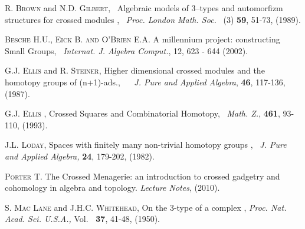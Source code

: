 \documentclass[a4paper,11pt]{article}
\theoremstyle{plain}
\theoremstyle{definition}
\begin{document}
\begin{thebibliography}{99}
	
	 \textsc{R. Brown} and \textsc{N.D. Gilbert}, \textrm{\
		Algebraic models of 3--types and automorfizm structures for crossed modules}
	, \ \emph{Proc. London Math. Soc.} \ (3) \textbf{59}, 51-73, (1989).
	
	 \textsc{Besche H.U., Eick B. and O'Brien E.A.} A
	millennium project: constructing Small Groups, \emph{\ Internat. J. Algebra
		Comput.}, 12, 623 - 644 (2002).
	
	
	
	
	
	 \textsc{G.J. Ellis } and \textsc{R. Steiner}, \textrm{Higher
		dimensional crossed modules and the homotopy groups of (n+1)-ads.}, \ \emph{%
		\ J. Pure and Applied Algebra}, \textbf{46}, 117-136, (1987).
	
	 \textsc{G.J. Ellis }, \textrm{Crossed Squares and
		Combinatorial Homotopy}, \ \emph{Math. Z.}, \textbf{461}, 93-110, (1993).
	
	 \textsc{J.L. Loday}, \textrm{Spaces with finitely many
		non-trivial homotopy groups }, \ \emph{J. Pure and Applied Algebra, }
	\textbf{24}, 179-202, (1982).
	
	 \textsc{Porter T.} The Crossed Menagerie: an introduction
	to crossed gadgetry and cohomology in algebra and topology. \emph{Lecture
		Notes}, (2010).
	
	 \textsc{S. Mac Lane} and \textsc{J.H.C. Whitehead}, \textrm{On
		the 3-type of a complex }, \emph{Proc. Nat. Acad. Sci. U.S.A.,} Vol. \textbf{%
		\ 37}, 41-48, (1950).
	

\end{thebibliography}
\end{document}

